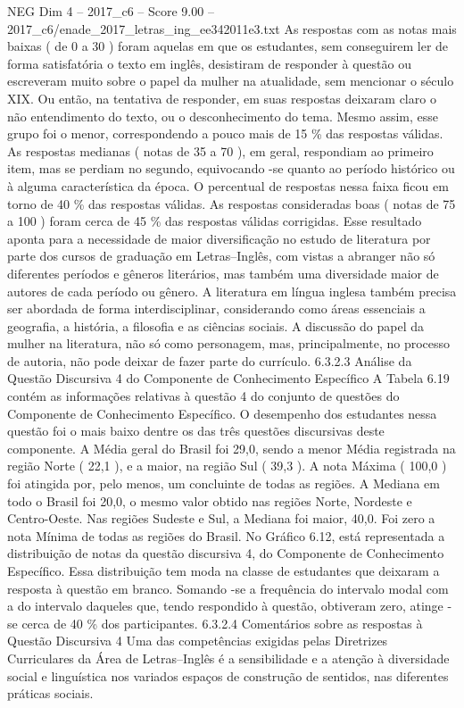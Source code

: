 \begin{textsample}{NEG Dim 4 – 2017\_c6 – Score 9.00 – 2017\_c6/enade\_2017\_letras\_ing\_ee342011e3.txt}
As respostas com as notas mais baixas ( de 0 a 30 ) foram aquelas em que os estudantes, sem conseguirem ler de forma satisfatória o texto em inglês, desistiram de responder à questão ou escreveram muito sobre o papel da mulher na atualidade, sem mencionar o século XIX.
Ou então, na tentativa de responder, em suas respostas deixaram claro o não entendimento do texto, ou o desconhecimento do tema.
Mesmo assim, esse grupo foi o menor, correspondendo a pouco mais de 15 \% das respostas válidas.
As respostas medianas ( notas de 35 a 70 ), em geral, respondiam ao primeiro item, mas se perdiam no segundo, equivocando -se quanto ao período histórico ou à alguma característica da época.
O percentual de respostas nessa faixa ficou em torno de 40 \% das respostas válidas.
As respostas consideradas boas ( notas de 75 a 100 ) foram cerca de 45 \% das respostas válidas corrigidas.
Esse resultado aponta para a necessidade de maior diversificação no estudo de literatura por parte dos cursos de graduação em Letras–Inglês, com vistas a abranger não só diferentes períodos e gêneros literários, mas também uma diversidade maior de autores de cada período ou gênero.
A literatura em língua inglesa também precisa ser abordada de forma interdisciplinar, considerando como áreas essenciais a geografia, a história, a filosofia e as ciências sociais.
A discussão do papel da mulher na literatura, não só como personagem, mas, principalmente, no processo de autoria, não pode deixar de fazer parte do currículo. 6.3.2.3 Análise da Questão Discursiva 4 do Componente de Conhecimento Específico A Tabela 6.19 contém as informações relativas à questão 4 do conjunto de questões do Componente de Conhecimento Específico.
O desempenho dos estudantes nessa questão foi o mais baixo dentre os das três questões discursivas deste componente.
A Média geral do Brasil foi 29,0, sendo a menor Média registrada na região Norte ( 22,1 ), e a maior, na região Sul ( 39,3 ).
A nota Máxima ( 100,0 ) foi atingida por, pelo menos, um concluinte de todas as regiões.
A Mediana em todo o Brasil foi 20,0, o mesmo valor obtido nas regiões Norte, Nordeste e Centro-Oeste.
Nas regiões Sudeste e Sul, a Mediana foi maior, 40,0.
Foi zero a nota Mínima de todas as regiões do Brasil.
No Gráfico 6.12, está representada a distribuição de notas da questão discursiva 4, do Componente de Conhecimento Específico.
Essa distribuição tem moda na classe de estudantes que deixaram a resposta à questão em branco.
Somando -se a frequência do intervalo modal com a do intervalo daqueles que, tendo respondido à questão, obtiveram zero, atinge -se cerca de 40 \% dos participantes. 6.3.2.4 Comentários sobre as respostas à Questão Discursiva 4 Uma das competências exigidas pelas Diretrizes Curriculares da Área de Letras–Inglês é a sensibilidade e a atenção à diversidade social e linguística nos variados espaços de construção de sentidos, nas diferentes práticas sociais.

\end{textsample}
